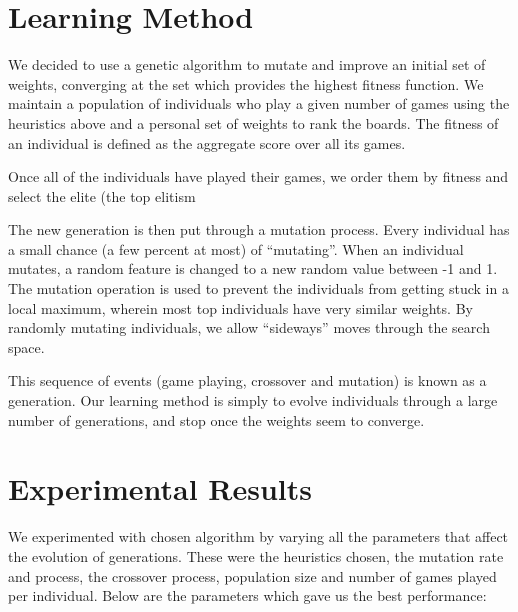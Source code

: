\documentclass[12pt,a4paper]{report}
\begin{document}
\cite{leeyiyuan2013tetris}
\cite{lindstedt2013extreme}

\section{Learning Method}
We decided to use a genetic algorithm to mutate and improve an initial set of weights, converging at the set which provides the highest fitness function. We maintain a population of individuals who play a given number of games using the heuristics above and a personal set of weights to rank the boards. The fitness of an individual is defined as the aggregate score over all its games.

Once all of the individuals have played their games, we order them by fitness and select the elite (the top elitism%

The new generation is then put through a mutation process. Every individual has a small chance (a few percent at most) of “mutating”. When an individual mutates, a random feature is changed to a new random value between -1 and 1. The mutation operation is used to prevent the individuals from getting stuck in a local maximum, wherein most top individuals have very similar weights. By randomly mutating individuals, we allow “sideways” moves through the search space.

This sequence of events (game playing, crossover and mutation) is known as a generation. Our learning method is simply to evolve individuals through a large number of generations, and stop once the weights seem to converge.

\section{Experimental Results}
We experimented with chosen algorithm by varying all the parameters that affect the evolution of generations. These were the heuristics chosen, the mutation rate and process, the crossover process, population size and number of games played per individual. Below are the parameters which gave us the best performance:
\end{document}
